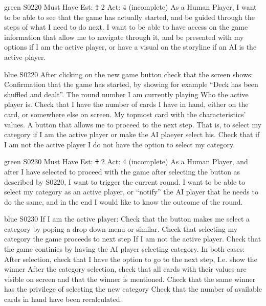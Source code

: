 \newpage

\begin{card}{green}
{S0220}
{Must Have}
{Est: \st{1} 2}
{Act: 4 (incomplete)}
As a Human Player, I want to be able to see that the game has actually started, and be guided through the steps of what I need to do next. 
I want to be able to have access on the game information that allow me to navigate through it, and be presented with my options if I am the active player, or have a visual on the storyline if an AI is the active player.
\end{card}

\begin{card}{blue}
{S0220}{}{}{}
After clicking on the new game button check that the screen shows: Confirmation that the game has started, by showing for example ``Deck has been shuffled and dealt''.
The round number I am currently playing Who the active player is.
Check that I have the number of cards I have in hand, either on the card, or somewhere else on screen.
My topmost card with the characteristics' values.
A button that allows me to proceed to the next step. 
That is, to select my category if I am the active player or make the AI plaeyer select his. 
Check that if I am not the active player I do not have the option to select my category.
\end{card}


\newpage

\begin{card}{green}
{S0230}
{Must Have}
{Est: \st{1} 2}
{Act: 4 (incomplete)}
As a Human Player, and after I have selected to proceed with the game after selecting the button as described by S0220, I want to trigger the current round.
I want to be able to select my category as an active player, or ``notify'' the AI player that he needs to do the same, and in the end I would like to know the outcome of the round.
\end{card}

\begin{card}{blue}
{S0230}{}{}{}
If I am the active player: Check that the button makes me select a category by poping a drop down menu or similar. 
Check that selecting my category the game proceeds to next step If I am not the active player. 
Check that the game continies by having the AI player selecting category.
In both cases: After selection, check that I have the option to go to the next step, I.e. show the winner After the category selection, check that all cards with their values are visible on screen and that the winner is mentioned. 
Check that the same winner has the privilege of selecting the new category Check that the number of available cards in hand have been recalculated.
\end{card}

